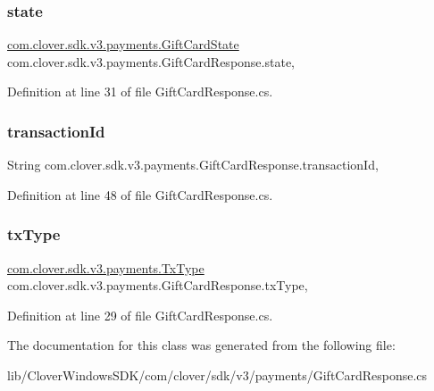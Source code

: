 \subsubsection{\texorpdfstring{state}{state}}
{\footnotesize\ttfamily \hyperlink{namespacecom_1_1clover_1_1sdk_1_1v3_1_1payments_a67d9d7bce276d6e020d49ff3f322fce3}{com.\+clover.\+sdk.\+v3.\+payments.\+Gift\+Card\+State} com.\+clover.\+sdk.\+v3.\+payments.\+Gift\+Card\+Response.\+state\hspace{0.3cm}{\ttfamily [get]}, {\ttfamily [set]}}



Definition at line 31 of file Gift\+Card\+Response.\+cs.

\mbox{\label{classcom_1_1clover_1_1sdk_1_1v3_1_1payments_1_1_gift_card_response_a5ea7db0219832416ef3cbbfcb9e08515}} 
\subsubsection{\texorpdfstring{transaction\+Id}{transactionId}}
{\footnotesize\ttfamily String com.\+clover.\+sdk.\+v3.\+payments.\+Gift\+Card\+Response.\+transaction\+Id\hspace{0.3cm}{\ttfamily [get]}, {\ttfamily [set]}}



Definition at line 48 of file Gift\+Card\+Response.\+cs.

\mbox{\label{classcom_1_1clover_1_1sdk_1_1v3_1_1payments_1_1_gift_card_response_aee1f7f1c4ee508658dd5b13cf897c640}} 
\subsubsection{\texorpdfstring{tx\+Type}{txType}}
{\footnotesize\ttfamily \hyperlink{namespacecom_1_1clover_1_1sdk_1_1v3_1_1payments_ad4411d3ee4c0997584ff0df20764ba06}{com.\+clover.\+sdk.\+v3.\+payments.\+Tx\+Type} com.\+clover.\+sdk.\+v3.\+payments.\+Gift\+Card\+Response.\+tx\+Type\hspace{0.3cm}{\ttfamily [get]}, {\ttfamily [set]}}



Definition at line 29 of file Gift\+Card\+Response.\+cs.



The documentation for this class was generated from the following file\+:\begin{DoxyCompactItemize}
\item 
lib/\+Clover\+Windows\+S\+D\+K/com/clover/sdk/v3/payments/Gift\+Card\+Response.\+cs\end{DoxyCompactItemize}
